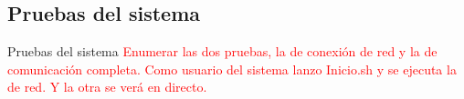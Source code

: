 \documentclass[aspectratio=169]{beamer}
\begin{document}
\subsection{Pruebas del sistema}
\begin{frame}{Pruebas del sistema}
	\textcolor{red}{Enumerar las dos pruebas, la de conexión de red y la de comunicación completa. Como usuario del sistema lanzo Inicio.sh y se ejecuta la de red. Y la otra se verá en directo.}
\end{frame}
%
%
%
\end{document}
